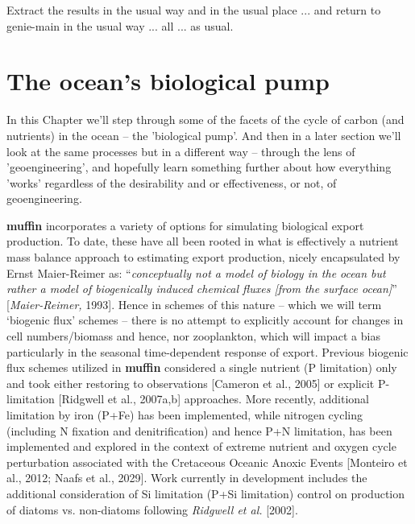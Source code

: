 \vspace{2mm}
\noindent Extract the results in the usual way and in the usual place ... and return to \textsf{\footnotesize genie-main} in the usual way ... all ... as usual.

\newpage

\section*{The ocean's biological pump}

In this Chapter we'll step through some of the facets of the cycle of carbon (and nutrients) in the ocean -- the 'biological pump'. And then in a later section we'll look at the same processes but in a different way -- through the lens of 'geoengineering', and hopefully learn something further about how everything 'works' regardless of the desirability and or effectiveness, or not, of geoengineering.

\textbf{muffin} incorporates a variety of options for simulating biological export production. To date, these have all been rooted in what is effectively a nutrient mass balance approach to estimating export production, nicely encapsulated by Ernst Maier-Reimer as: “\textit{conceptually not a model of biology in the ocean but rather a model of biogenically induced chemical fluxes [from the surface ocean]}” [\textit{Maier-Reimer,} 1993]. Hence in schemes of this nature -- which we will term ‘biogenic  flux’ schemes --  there is no attempt to explicitly account for changes in cell numbers/biomass and hence, nor zooplankton, which will impact a bias particularly in the seasonal time-dependent response of export. Previous biogenic flux schemes utilized in  \textbf{muffin}  considered a single nutrient (P limitation) only and took either restoring to observations [Cameron et al., 2005] or explicit P-limitation [Ridgwell et al., 2007a,b] approaches. More recently, additional limitation by iron (P+Fe) has been implemented, while nitrogen cycling (including N fixation and denitrification) and hence P+N limitation, has been implemented and explored in the context of extreme nutrient and oxygen cycle perturbation associated with the Cretaceous Oceanic Anoxic Events [Monteiro et al., 2012; Naafs et al., 2029]. Work currently in development includes the additional consideration of Si limitation (P+Si limitation) control on production of diatoms vs. non-diatoms following \textit{Ridgwell et al.} [2002].

